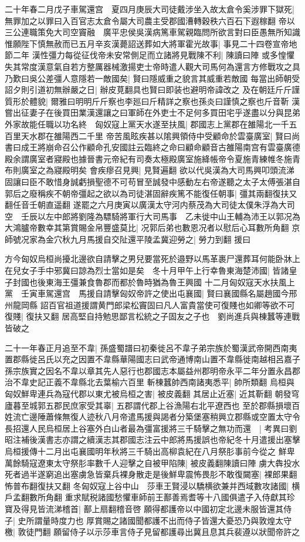 二十年春二月戊子車駕還宫　夏四月庚辰大司徒戴涉坐入故太倉令奚涉罪下獄死|{
	無罪加之以罪曰入百官志太倉令屬大司農主受郡國漕轉穀秩六百石下遐稼翻}
帝以三公連職策免大司空竇融　廣平忠侯吳漢病篤車駕親臨問所欲言對曰臣愚無所知識惟願陛下慎無赦而已五月辛亥漢薨詔送葬如大將軍霍光故事|{
	事見二十四卷宣帝地節二年}
漢性彊力每從征伐帝未安常側足而立諸將見戰陳不利|{
	陳讀曰陣}
或多惶懼失其常度漢意氣自若方整厲器械激揚吏士帝時遣人觀大司馬何為還言方修戰攻之具乃歎曰吳公差彊人意隱若一敵國矣|{
	賢曰隱威重之貌言其威重若敵國}
每當出師朝受詔夕則引道初無辦嚴之日|{
	辦皮莧翻具也賢曰即装也避明帝諱改之}
及在朝廷斤斤謹質形於體貌|{
	爾雅曰明明斤斤察也李廵曰斤精詳之察也孫炎曰謹慎之察也斤音靳}
漢嘗出征妻子在後買田業漢還讓之曰軍師在外吏士不足何多買田宅乎遂盡以分與昆弟外家故能任職以功名終　匈奴寇上黨天水遂至扶風|{
	郡國志上黨郡在雒陽北一千五百里天水郡在雒陽西二千里}
帝苦風眩疾甚以隂興領侍中受顧命於雲臺廣室|{
	賢曰尚書曰成王將崩命召公作顧命孔安國註云臨終之命曰顧命顧音古雒陽南宫有雲臺廣德殿余謂廣室者寢殿也據晉書元帝紀有司奏太極殿廣室施絳帳帝令夏施青練帷冬施青布則廣室之為寢殿明矣}
會疾瘳召見興|{
	見賢遍翻}
欲以代吳漢為大司馬興叩頭流涕固讓曰臣不敢惜身誠虧損聖德不可苟冒至誠發中感動左右帝遂聽之太子太傅張湛自郭后之廢稱疾不朝帝彊起之欲以為司徒湛固辭疾篤不能復任朝事|{
	彊其兩翻復扶又翻任音壬朝直遥翻}
遂罷之六月庚寅以廣漢太守河内蔡茂為大司徒太僕朱浮為大司空　壬辰以左中郎將劉隆為驃騎將軍行大司馬事　乙未徙中山王輔為沛王以郭况為大鴻臚帝數幸其第賞賜金帛豐盛莫比|{
	况郭后弟也數恩况者以慰后心耳數所角翻}
京師號况家為金穴秋九月馬援自交阯還平陵孟冀迎勞之|{
	勞力到翻}
援曰

方今匈奴烏桓尚擾北邊欲自請擊之男兒要當死於邉野以馬革裹尸還葬耳何能卧牀上在兒女子手中邪冀曰諒為烈士當如是矣　冬十月甲午上行幸魯東海楚沛國|{
	皆諸皇子封國也後東海王彊兼食魯郡而都於魯時猶為魯王興國}
十二月匈奴寇天水扶風上黨　壬寅車駕還宫　馬援自請擊匈奴帝許之使出屯襄國|{
	賢曰襄國縣名屬趙國今邢州龍岡縣}
詔百官祖道援謂黄門郎梁松竇固曰凡人富貴當使可復賤也如卿等欲不可復賤|{
	復扶又翻}
居高堅自持勉思鄙言松統之子固友之子也　劉尚進兵與棟蠶等連戰皆破之

二十一年春正月追至不韋|{
	孫盛蜀譜曰初秦徙呂不韋子弟宗族於蜀漢武帝開西南夷置郡縣徙呂氏以充之因置不韋縣華陽國志曰武帝通博南山置不韋縣徙南越相呂嘉子孫宗族實之因名不韋以章其先人惡行也郡國志本屬益州郡明帝永平二年分置永昌郡治不韋史記正義不韋縣北去葉榆六百里}
斬棟蠶帥西南諸夷悉平|{
	帥所類翻}
烏桓與匈奴鮮卑連兵為寇代郡以東尤被烏桓之害|{
	被皮義翻}
其居止近塞|{
	近其靳翻}
朝發穹廬暮至城郭五郡民庶家受其辜|{
	五郡謂代郡上谷漁陽右北平遼西也}
至於郡縣損壞百姓流亡邊陲蕭條無復人迹秋八月帝遣馬援與謁者分築堡塞稍興立郡縣或空置太守令長招還人民烏桓居上谷塞外白山者最為彊富援將三千騎擊之無功而還　|{
	考異曰劉昭注補後漢書志亦謂之續漢志其郡國志注云中郎將馬援誤也帝紀冬十月遣援出塞擊烏桓援傳十二月出屯襄國明年秋將三千騎出高柳袁紀在八月祭肜事前今從之}
鮮卑萬餘騎寇遼東太守祭肜率數千人迎擊之自被甲陷陳|{
	被皮義翻陳讀曰陣}
虜大犇投水死者過半遂窮追出塞虜急皆棄兵裸身散走是後鮮卑震怖畏肜不敢復闚塞|{
	裸郎果翻怖普布翻復扶又翻}
冬匈奴寇上谷中山　莎車王賢浸以驕横欲兼并西域數攻諸國|{
	横戶孟翻數所角翻}
重求賦税諸國愁懼車師前王鄯善焉耆等十八國俱遣子入侍獻其珍寶及得見皆流涕稽首|{
	鄯上扇翻稽音啓}
願得都護帝以中國初定北邊未服皆還其侍子|{
	史所謂量時度力也}
厚賞賜之諸國聞都護不出而侍子皆還大憂恐乃與敦煌太守檄|{
	敦徒門翻}
願留侍子以示莎車言侍子見留都護尋出冀且息其兵裴遵以狀聞帝許之

